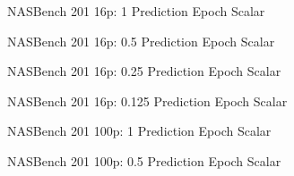 \documentclass[twocolumn]{article}
\begin{document}
\begin{figure}[!h]
    \begin{center}
        \resizebox{0.9\columnwidth}{!}{
            
        }
        \caption{NASBench 201 16p: 1 Prediction Epoch Scalar}
        \label{fig:nasbench_16_1x_acceleration}
    \end{center}
\end{figure}

\begin{figure}[!h]
    \begin{center}
        \resizebox{0.95\columnwidth}{!}{
            
        }
        \caption{NASBench 201 16p: 0.5 Prediction Epoch Scalar}
        \label{fig:nasbench_16_2x_acceleration}
    \end{center}
\end{figure}

\begin{figure}[!h]
    \begin{center}
        \resizebox{0.95\columnwidth}{!}{
            
        }
        \caption{NASBench 201 16p: 0.25 Prediction Epoch Scalar}
        \label{fig:nasbench_16_4x_acceleration}
    \end{center}
\end{figure}

\begin{figure}[!h]
    \begin{center}
        \resizebox{0.95\columnwidth}{!}{
            
        }
        \caption{NASBench 201 16p: 0.125 Prediction Epoch Scalar}
        \label{fig:nasbench_16_8x_acceleration}
    \end{center}
\end{figure}

\begin{figure}[!h]
    \begin{center}
        \resizebox{0.9\columnwidth}{!}{
            
        }
        \caption{NASBench 201 100p: 1 Prediction Epoch Scalar}
        \label{fig:nasbench_100_1x_acceleration}
    \end{center}
\end{figure}

\begin{figure}[!h]
    \begin{center}
        \resizebox{0.95\columnwidth}{!}{
            
        }
        \caption{NASBench 201 100p: 0.5 Prediction Epoch Scalar}
        \label{fig:nasbench_100_2x_acceleration}
    \end{center}
\end{figure}
\end{document}
